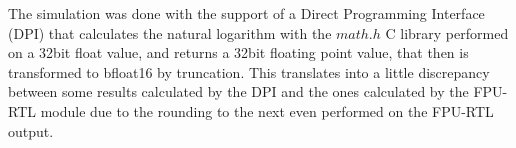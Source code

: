 \documentclass{report}
\begin{document}
The simulation was done with the support of a Direct Programming Interface (DPI) that calculates the natural logarithm with the $math.h$ C library performed on a 32bit float value, and returns a 32bit floating point value, that then is transformed to bfloat16 by truncation. This translates into a little discrepancy between some results calculated by the DPI and the ones calculated by the FPU-RTL module due to the rounding to the next even performed on the FPU-RTL output.
\end{document}
